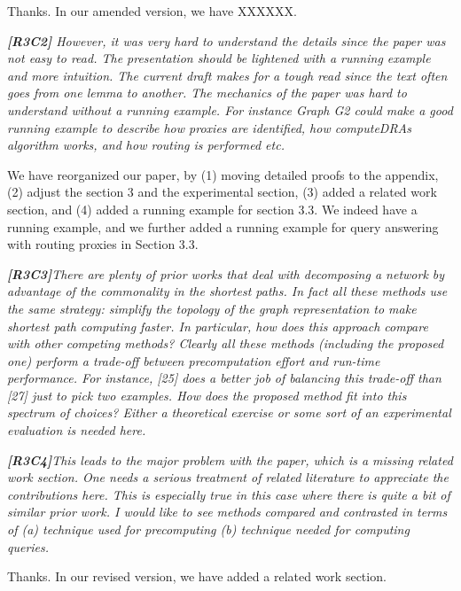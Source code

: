 \documentclass[11pt]{letter}
\newcommand{\vs}{\vspace{1ex}}
\newcommand{\svs}{\vspace{0.36ex}}
\begin{document}
Thanks. In our amended version, we have XXXXXX.



\vs
\noindent
{\em{\bf[R3C2]}  However, it was very hard to understand the details since the paper was not easy to read. The presentation should be lightened with a running example and more intuition.  The current draft makes for a tough read since the text often goes from one lemma to another. The mechanics of the paper was hard to understand without a running example.  For instance Graph G2 could make a good running example to describe how proxies are identified, how computeDRAs algorithm works, and how routing is performed etc.}
\svs

We have reorganized our paper, by (1) moving detailed proofs to the appendix, (2) adjust the section 3 and the experimental section, (3) added a related work section, and (4) added a running example for section 3.3. We indeed have a running example, and we further added a running example for query answering with routing proxies in Section 3.3.


\vs
\noindent
{\em{\bf[R3C3]}There are plenty of prior works that deal with decomposing a network by advantage of the commonality in the shortest paths. In fact all these methods use the same strategy: simplify the topology of the graph representation to make shortest path computing faster. In particular, how does this approach compare with other competing methods? Clearly all these methods (including the proposed one) perform a trade-off between precomputation effort and run-time performance. For instance, [25] does a better job of balancing this trade-off than [27] just to pick two examples. How does the proposed method fit into this spectrum of choices? Either a theoretical exercise or some sort of an experimental evaluation is needed here.}
\svs

\vs
\noindent
{\em{\bf[R3C4]}This leads to the major problem with the paper, which is a missing related work section.  One needs a serious treatment of related literature to appreciate the contributions here. This is especially true in this case where there is quite a bit of similar prior work. I would like to see methods compared and contrasted in terms of (a) technique used for precomputing (b) technique needed for computing queries.}
\svs

Thanks. In our revised version, we have added a related work section.
\end{document}
